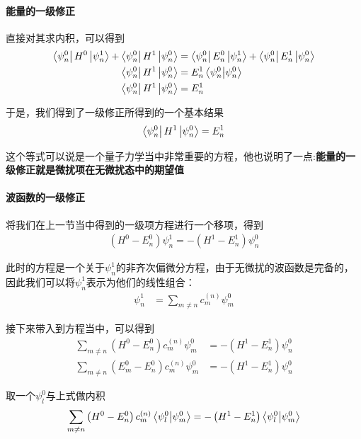 \documentclass{article}
\begin{document}
\paragraph{能量的一级修正}直接对其求内积，可以得到
\begin{align*}
    \bra{\psi_n^0}H^0\ket{\psi_n^1}+\bra{\psi_n^0}H^1\ket{\psi_n^0}&=\bra{\psi_n^0}E_n^0\ket{\psi_n^1}+\bra{\psi_n^0}E_n^1\ket{\psi_n^0}\\
    \bra{\psi_n^0}H^1\ket{\psi_n^0}&=E_n^1\braket{\psi_n^0}{\psi_n^0}\\
    \bra{\psi_n^0}H^1\ket{\psi_n^0}&=E_n^1
\end{align*}

于是，我们得到了一级修正所得到的一个基本结果
\begin{equation*}
    \bra{\psi_n^0}H^1\ket{\psi_n^0}=E_n^1
\end{equation*}

这个等式可以说是一个量子力学当中非常重要的方程，他也说明了一点:\textbf{能量的一级修正就是微扰项在无微扰态中的期望值}

\paragraph{波函数的一级修正}将我们在上一节当中得到的一级项方程进行一个移项，得到
\begin{align*}
    \left(H^0-E_n^0\right)\psi_n^1=-\left(H^1-E_n^1\right)\psi_n^0
\end{align*}

此时的方程是一个关于$\psi_n^1$的非齐次偏微分方程，由于无微扰的波函数是完备的，因此我们可以将$\psi_n^1$表示为他们的线性组合：
\begin{align*}
    \psi_n^1&=\sum_{m\neq n}c_m^{(n)}\psi_m^0
\end{align*}

接下来带入到方程当中，可以得到
\begin{align*}
    \sum_{m\neq n}\left(H^0-E_n^0\right)c_m^{(n)}\psi_m^0&=-\left(H^1-E_n^1\right)\psi_n^0\\
    \sum_{m\neq n}\left(E_m^0-E_n^0\right)c_m^{(n)}\psi_m^0&=-\left(H^1-E_n^1\right)\psi_n^0
\end{align*}

取一个$\psi_l^0$与上式做内积
\begin{align*}
    \sum_{m\neq n}\left(H^0-E_n^0\right)c_m^{(n)}\braket{\psi_l^0}{\psi_m^0}&=-\left(H^1-E_n^1\right)\braket{\psi_l^0}{\psi_m^0}\\
\end{align*}
\end{document}
